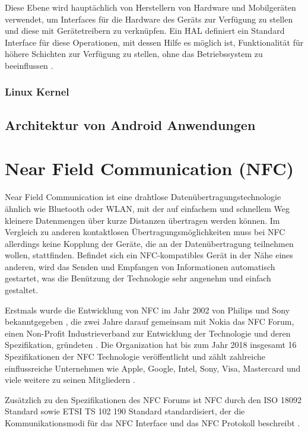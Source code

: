 Diese Ebene wird hauptächlich von Herstellern von Hardware und Mobilgeräten verwendet, um Interfaces für die Hardware des Geräts zur Verfügung zu stellen und diese mit Gerätetreibern zu verknüpfen. Ein HAL definiert ein Standard Interface für diese Operationen, mit dessen Hilfe es möglich ist, Funktionalität für höhere Schichten zur Verfügung zu stellen, ohne das Betriebssystem zu beeinflussen \cite{structure-of-android-os, android-hal}.

\subsubsection{Linux Kernel}



\subsection{Architektur von Android Anwendungen}

\section{Near Field Communication (NFC)}

Near Field Communication ist eine drahtlose Datenübertragungstechnologie ähnlich wie Bluetooth oder WLAN, mit der auf einfachem und schnellem Weg kleinere Datenmengen 
über kurze Distanzen übertragen werden können. Im Vergleich zu anderen kontaktlosen Übertragungsmöglichkeiten muss bei NFC allerdings keine Kopplung der Geräte, die an der Datenübertragung teilnehmen wollen, stattfinden. Befindet sich ein NFC-kompatibles Gerät in der Nähe eines anderen, wird das Senden und Empfangen von Informationen automatisch
gestartet, was die Benützung der Technologie sehr angenehm und einfach gestaltet. 

Erstmals wurde die Entwicklung von NFC im Jahr 2002 von Philips und Sony bekanntgegeben \cite{sonyPhillipsNfcPressRelease}, die zwei Jahre darauf gemeinsam mit Nokia das NFC Forum, einen Non-Profit Industrieverband zur Entwicklung der Technologie und deren Spezifikation, gründeten \cite{nfcHistory, nfcForum}. Die Organization hat bis zum Jahr 2018 insgesamt 16 Spezifikationen der NFC Technologie veröffentlicht und zählt zahlreiche einflussreiche Unternehmen wie Apple, Google, Intel, Sony, Visa, Mastercard und viele weitere zu seinen Mitgliedern \cite{nfcForum}. 

Zusätzlich zu den Spezifikationen des NFC Forums ist NFC durch den ISO 18092 Standard sowie ETSI TS 102 190 Standard standardisiert, der die Kommunikationsmodi für das NFC Interface und das NFC Protokoll beschreibt \cite{iso:iec18092:2013, etsi:ts:102:190}.

